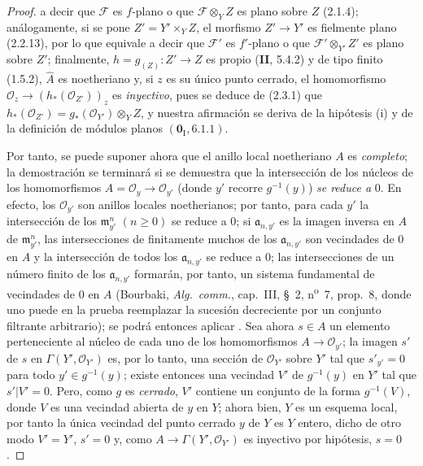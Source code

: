 \begin{proof}
a decir que $\mathcal F$ es $f$-plano o que $\mathcal F\otimes_Y Z$ es plano sobre $Z$ (2.1.4); análogamente, si se
pone $Z'=Y'\times_Y Z$, el morfismo $Z'\to Y'$ es fielmente plano (2.2.13), por lo que
equivale a decir que $\mathcal F'$ es $f'$-plano o que $\mathcal F'\otimes_{Y'}Z'$ es plano sobre $Z'$; finalmente, $h=g_{(Z)}:Z'\to Z$
es propio (\textbf{II}, 5.4.2) y de tipo finito (1.5.2), $\widehat A$ es noetheriano y, si $z$ es su
único punto cerrado, el homomorfismo $\mathcal O_z\to(h_*(\mathcal O_{Z'}))_z$ es \emph{inyectivo}, pues se deduce de (2.3.1) que
$h_*(\mathcal O_{Z'})=g_*(\mathcal O_{Y'})\otimes_Y Z$, y nuestra afirmación se deriva de la hipótesis (i) y de la definición de
módulos planos $(\mathbf 0_{\mathrm I},6.1.1)$.

Por tanto, se puede suponer ahora que el anillo local noetheriano $A$ es \emph{completo}; la demostración
se terminará si se demuestra que la intersección de los núcleos de los homomorfismos
$A=\mathcal O_y\to\mathcal O_{y'}$ (donde $y'$ recorre $g^{-1}(y)$) \emph{se reduce a} $0$. En efecto, los $\mathcal O_{y'}$ son anillos locales
noetherianos; por tanto, para cada $y'$ la intersección de los $\mathfrak m_{y'}^n$ $(n\geq0)$ se reduce a $0$;
si $\mathfrak a_{n,y'}$ es la imagen inversa en $A$ de $\mathfrak m_{y'}^n$, las intersecciones de finitamente muchos de los $\mathfrak a_{n,y'}$ son
vecindades de $0$ en $A$ y la intersección de todos los $\mathfrak a_{n,y'}$ se reduce a $0$; las intersecciones de
un número finito de los $\mathfrak a_{n,y'}$ formarán, por tanto, un sistema fundamental de vecindades de $0$ en $A$
(Bourbaki, \emph{Alg.\ comm.}, cap.~III, \S~2, n\textsuperscript{o}~7, prop.~8, donde uno puede en la prueba
reemplazar la sucesión decreciente por un conjunto filtrante arbitrario); se podrá entonces
aplicar . Sea ahora $s\in A$ un elemento perteneciente al núcleo de cada uno de
los homomorfismos $A\to\mathcal O_{y'}$; la imagen $s'$ de $s$ en $\Gamma(Y',\mathcal O_{Y'})$ es, por lo tanto, una sección
de $\mathcal O_{Y'}$ sobre $Y'$ tal que $s'_{y'}=0$ para todo $y'\in g^{-1}(y)$; existe entonces una vecindad $V'$
de $g^{-1}(y)$ en $Y'$ tal que $s'|V'=0$. Pero, como $g$ es \emph{cerrado}, $V'$ contiene un conjunto
de la forma $g^{-1}(V)$, donde $V$ es una vecindad abierta de $y$ en $Y$; ahora bien, $Y$ es un esquema local, por tanto la única
vecindad del punto cerrado $y$ de $Y$ es $Y$ entero, dicho de otro modo $V'=Y'$,
$s'=0$ y, como $A\to\Gamma(Y',\mathcal O_{Y'})$ es inyectivo por hipótesis, $s=0$.
\end{proof}

